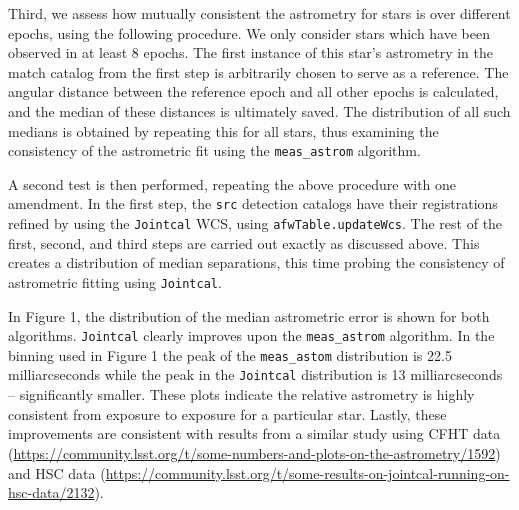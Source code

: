\documentclass[modern]{aastex61}
\begin{document}
Third, we assess how mutually consistent the astrometry for stars is over different epochs, using the following procedure. We only consider stars which have been observed in at least 8 epochs. The first instance of this star's astrometry in the match catalog from the first step is arbitrarily chosen to serve as a reference. The angular distance between the reference epoch and all other epochs is calculated, and the median of these distances is ultimately saved. The distribution of all such medians is obtained by repeating this for all stars, thus examining the consistency of the astrometric fit using the {\tt\string meas\_astrom} algorithm.

A second test is then performed, repeating the above procedure with one amendment. In the first step, the {\tt\string src} detection catalogs have their registrations refined by using the {\tt\string Jointcal} WCS, using {\tt\string afwTable.updateWcs}. The rest of the first, second, and third steps are carried out exactly as discussed above. This creates a distribution of median separations, this time probing the consistency of astrometric fitting using {\tt\string Jointcal}.

In Figure 1, the distribution of the median astrometric error is shown for both algorithms. {\tt\string Jointcal} clearly improves upon the {\tt\string meas\_astrom} algorithm. In the binning used in Figure 1 the peak of the {\tt\string meas\_astom} distribution is 22.5 milliarcseconds while the peak in the {\tt\string Jointcal} distribution is 13 milliarcseconds -- significantly smaller. These plots indicate the relative astrometry is highly consistent from exposure to exposure for a particular star. Lastly, these improvements are consistent with results from a similar study using CFHT data
(\url{https://community.lsst.org/t/some-numbers-and-plots-on-the-astrometry/1592}) and HSC data (\url{https://community.lsst.org/t/some-results-on-jointcal-running-on-hsc-data/2132}).
\end{document}
